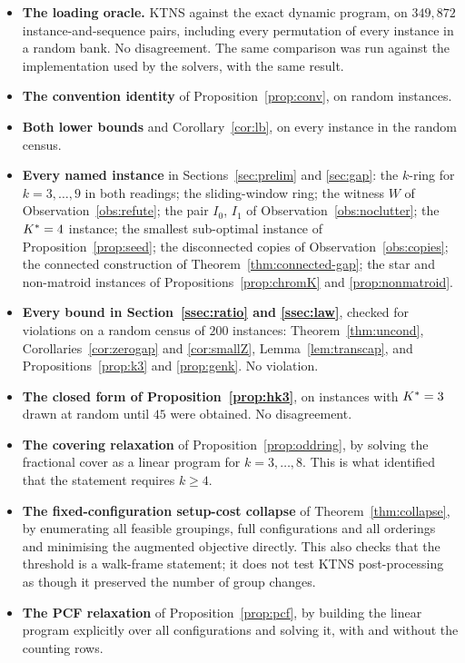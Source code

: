 \begin{itemize}[topsep=4pt,itemsep=2pt]
  \item \textbf{The loading oracle.} KTNS against the exact dynamic program, on
  $349{,}872$ instance-and-sequence pairs, including every permutation of every instance
  in a random bank. No disagreement. The same comparison was run against the
  implementation used by the solvers, with the same result.
  \item \textbf{The convention identity} of Proposition~\ref{prop:conv}, on random
  instances.
  \item \textbf{Both lower bounds} and Corollary~\ref{cor:lb}, on every instance in the
  random census.
  \item \textbf{Every named instance} in Sections~\ref{sec:prelim} and \ref{sec:gap}:
  the $k$-ring for $k=3,\dots,9$ in both readings; the sliding-window ring; the
  witness $W$ of Observation~\ref{obs:refute}; the pair $I_0$, $I_1$ of
  Observation~\ref{obs:noclutter}; the $K^{\ast}=4$ instance; the smallest sub-optimal
  instance of Proposition~\ref{prop:seed}; the disconnected copies of
  Observation~\ref{obs:copies}; the connected construction of
  Theorem~\ref{thm:connected-gap}; the star and non-matroid instances of
  Propositions~\ref{prop:chromK} and \ref{prop:nonmatroid}.
  \item \textbf{Every bound in Section~\ref{ssec:ratio} and \ref{ssec:law}}, checked
  for violations on a random census of $200$ instances: Theorem~\ref{thm:uncond},
  Corollaries~\ref{cor:zerogap} and \ref{cor:smallZ},
  Lemma~\ref{lem:transcap}, and Propositions~\ref{prop:k3} and \ref{prop:genk}. No
  violation.
  \item \textbf{The closed form of Proposition~\ref{prop:hk3}}, on instances with
  $K^{\ast}=3$ drawn at random until $45$ were obtained. No disagreement.
  \item \textbf{The covering relaxation} of Proposition~\ref{prop:oddring}, by solving
  the fractional cover as a linear program for $k=3,\dots,8$. This is what identified
  that the statement requires $k\ge4$.
  \item \textbf{The fixed-configuration setup-cost collapse} of
  Theorem~\ref{thm:collapse}, by enumerating all feasible groupings, full configurations
  and all orderings and minimising the augmented objective directly. This also checks
  that the threshold is a walk-frame statement; it does not test KTNS post-processing
  as though it preserved the number of group changes.
  \item \textbf{The PCF relaxation} of Proposition~\ref{prop:pcf}, by building the
  linear program explicitly over all configurations and solving it, with and without
  the counting rows.
\end{itemize}

